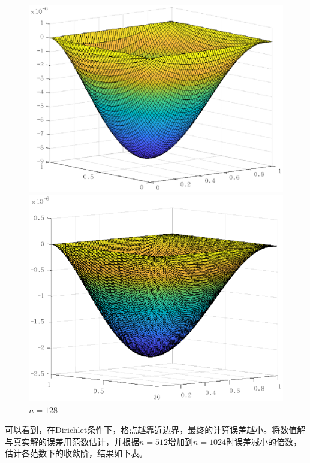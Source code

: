 \documentclass[lang=cn,10pt]{elegantbook}
\begin{document}
\begin{figure}[H]
\begin{minipage}[t]{0.24\linewidth}
    \includegraphics[width=0.95\linewidth]{figure/2-1-3.eps}
    \caption*{$n=64$}
  \end{minipage}
  \begin{minipage}[t]{0.24\linewidth}
    \centering
    \includegraphics[width=0.95\linewidth]{figure/2-1-4.eps}
    \caption*{$n=128$}
  \end{minipage}
\end{figure}

可以看到，在Dirichlet条件下，格点越靠近边界，最终的计算误差越小。将数值解与真实解的误差用范数估计，并根据$n=512$增加到$n=1024$时误差减小的倍数，估计各范数下的收敛阶，结果如下表。
\end{document}

